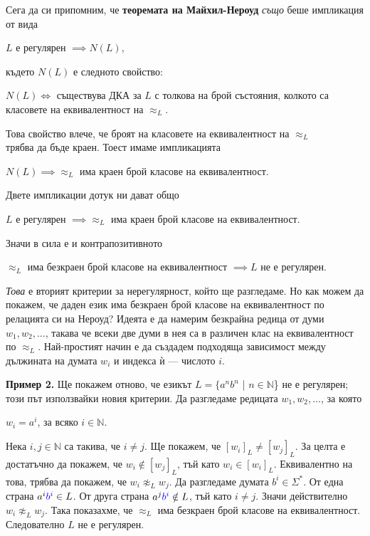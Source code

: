 \documentclass{article}
\begin{document}
    \hspace{15pt} Сега да си припомним, че \textbf{теоремата на Майхил-Нероуд} 
    \textit{също} беше импликация от вида 
    \begin{center}
        $L$ е регулярен $\implies N(L)$,
    \end{center}
    където $N(L)$ е следното свойство:
    \begin{center}
        $N(L) \iff$ съществува ДКА за $L$ с толкова на брой състояния, колкото са 
        класовете на еквивалентност на $\approx_L$.
    \end{center}
    Това свойство влече, че броят на класовете на еквивалентност на $\approx_L$ \\
    трябва да бъде краен. Тоест имаме импликацията
    \begin{center}
        $N(L) \implies \approx_L$ има краен брой класове на еквивалентност. 
    \end{center}
    Двете импликации дотук ни дават общо
    \begin{center}
        $L$ е регулярен $\implies \approx_L$ има краен брой класове на еквивалентност.
    \end{center}
    Значи в сила е и контрапозитивното
    \begin{center}
        $\approx_L$ има безкраен брой класове на еквивалентност $\implies L$ не е регулярен.
    \end{center}
    \textit{Това} е вторият критерии за нерегулярност, който ще разгледаме.
    Но как можем да покажем, че даден език има безкраен брой класове на еквивалентност
    по релацията си на Нероуд? Идеята е да намерим безкрайна редица от думи 
    $w_1,w_2,...$, такава че всеки две думи в нея са в различен клас на еквивалентност
    по $\approx_L$. Най-простият начин е да създадем подходяща зависимост между дължината
    на думата $w_i$ и индекса ѝ — числото $i$.

    \vspace{15pt}

    \textbf{Пример 2.} Ще покажем отново, че езикът $L = \{a^nb^n$ | $n \in \mathbb{N}$\}
    не е регулярен; този път използвайки новия критерии.
    Да разгледаме редицата $w_1,w_2,...$, за която 
    \begin{center}
        $w_i = a^i$, за всяко $i \in \mathbb{N}$.
    \end{center}
    Нека $i,j \in \mathbb{N}$ са такива, че $i \neq j$. Ще покажем, че $[w_i]_L \neq [w_j]_L$.
    За целта е достатъчно да покажем, че $w_i \notin [w_j]_L$, тъй като $w_i \in [w_i]_L$.
    Еквивалентно на това, трябва да покажем, че $w_i \not \approx_L w_j$. Да разгледаме
    думата $b^i \in \Sigma^*$. От една страна $a^i\textcolor{blue}{b^i} \in L$. От друга страна $a^j\textcolor{blue}{b^i} \notin L$,
    тъй като $i \neq j$. Значи действително $w_i \not \approx_L w_j$. Така показахме,
    че $\approx_L$ има безкраен брой класове на еквивалентност. Следователно $L$ не е
    регулярен.
    
\end{document}
